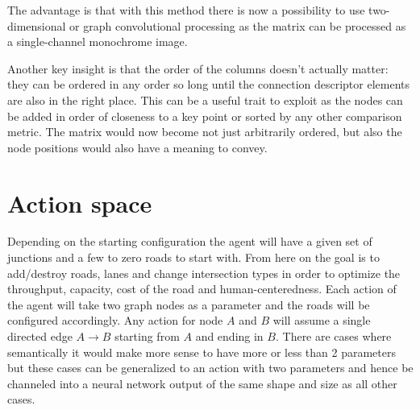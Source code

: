 \documentclass[
]{elteikthesis}[2023/04/10]
\begin{document}
The advantage is that with this method there is now a possibility
to use two-dimensional or graph convolutional processing as the matrix
can be processed as a single-channel monochrome image. 

Another key insight is that the order of the columns doesn't actually
matter: they can be ordered in any order so long until the connection
descriptor elements are also in the right place. This can be a useful
trait to exploit as the nodes can be added in order of closeness to
a key point or sorted by any other comparison metric. The matrix would
now become not just arbitrarily ordered, but also the node positions
would also have a meaning to convey.

\section{Action space}

Depending on the starting configuration the agent will have a given
set of junctions and a few to zero roads to start with. From here on
the goal is to add/destroy roads, lanes and change intersection types
in order to optimize the throughput, capacity, cost of the road
and human-centeredness. Each action of the agent will take two graph
nodes as a parameter and the roads will be configured accordingly.
Any action for node $A$ and $B$ will assume a single directed edge
$A\rightarrow B$ starting from $A$ and ending in $B$. There are
cases where semantically it would make more sense to have more or
less than 2 parameters but these cases can be generalized to an action
with two parameters and hence be channeled into a neural network output
of the same shape and size as all other cases.
\end{document}
